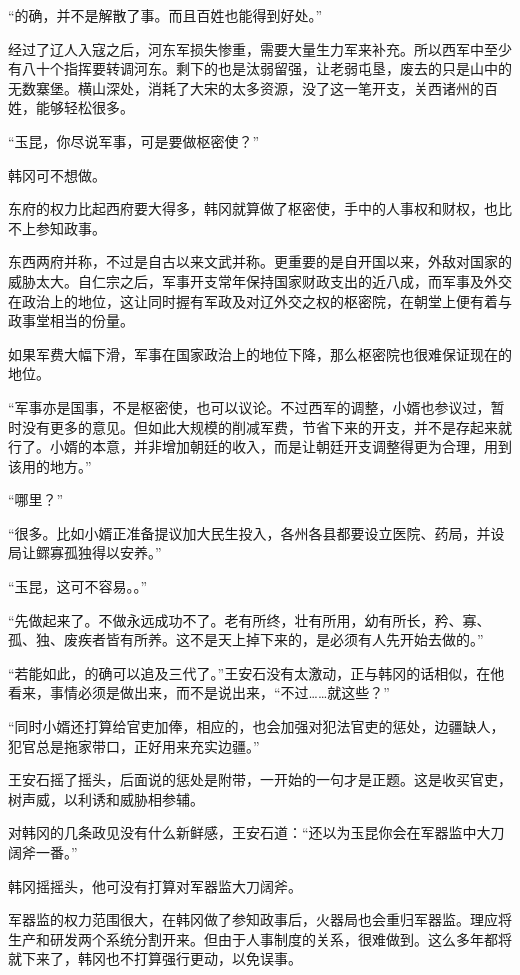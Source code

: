 “的确，并不是解散了事。而且百姓也能得到好处。”

经过了辽人入寇之后，河东军损失惨重，需要大量生力军来补充。所以西军中至少有八十个指挥要转调河东。剩下的也是汰弱留强，让老弱屯垦，废去的只是山中的无数寨堡。横山深处，消耗了大宋的太多资源，没了这一笔开支，关西诸州的百姓，能够轻松很多。

“玉昆，你尽说军事，可是要做枢密使？”

韩冈可不想做。

东府的权力比起西府要大得多，韩冈就算做了枢密使，手中的人事权和财权，也比不上参知政事。

东西两府并称，不过是自古以来文武并称。更重要的是自开国以来，外敌对国家的威胁太大。自仁宗之后，军事开支常年保持国家财政支出的近八成，而军事及外交在政治上的地位，这让同时握有军政及对辽外交之权的枢密院，在朝堂上便有着与政事堂相当的份量。

如果军费大幅下滑，军事在国家政治上的地位下降，那么枢密院也很难保证现在的地位。

“军事亦是国事，不是枢密使，也可以议论。不过西军的调整，小婿也参议过，暂时没有更多的意见。但如此大规模的削减军费，节省下来的开支，并不是存起来就行了。小婿的本意，并非增加朝廷的收入，而是让朝廷开支调整得更为合理，用到该用的地方。”

“哪里？”

“很多。比如小婿正准备提议加大民生投入，各州各县都要设立医院、药局，并设局让鳏寡孤独得以安养。”

“玉昆，这可不容易。。”

“先做起来了。不做永远成功不了。老有所终，壮有所用，幼有所长，矜、寡、孤、独、废疾者皆有所养。这不是天上掉下来的，是必须有人先开始去做的。”

“若能如此，的确可以追及三代了。”王安石没有太激动，正与韩冈的话相似，在他看来，事情必须是做出来，而不是说出来，“不过……就这些？”

“同时小婿还打算给官吏加俸，相应的，也会加强对犯法官吏的惩处，边疆缺人，犯官总是拖家带口，正好用来充实边疆。”

王安石摇了摇头，后面说的惩处是附带，一开始的一句才是正题。这是收买官吏，树声威，以利诱和威胁相参辅。

对韩冈的几条政见没有什么新鲜感，王安石道：“还以为玉昆你会在军器监中大刀阔斧一番。”

韩冈摇摇头，他可没有打算对军器监大刀阔斧。

军器监的权力范围很大，在韩冈做了参知政事后，火器局也会重归军器监。理应将生产和研发两个系统分割开来。但由于人事制度的关系，很难做到。这么多年都将就下来了，韩冈也不打算强行更动，以免误事。

